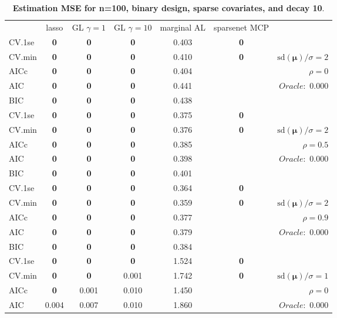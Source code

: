 \clearpage
\begin{table}\vspace{-.5cm}
\caption[l]{ { \bf Estimation MSE for n=100, binary design, 
sparse covariates, and  decay  10}.}
\vspace{-.5cm}
\footnotesize{}
\begin{center}
\begin{tabular}{l*{5}{c}|r}
& lasso & GL $\gamma=1$ & GL $\gamma=10$ & marginal AL & sparsenet MCP  & \\
 \cline{1-7}
CV.1se & {\bf 0} & {\bf 0} & {\bf 0} & 0.403 & {\bf 0} & \\
CV.min & {\bf 0} & {\bf 0} & {\bf 0} & 0.410 & {\bf 0} &  $\mathrm{sd}(\mathbf{\mu})/\sigma=2$ \\
AICc & {\bf 0} & {\bf 0} & {\bf 0} & 0.404 & & $\rho=0$ \\
AIC & {\bf 0} & {\bf 0} & {\bf 0} & 0.441 & &  \multirow{2}{*}{$Oracle: $ 0.000} \\
BIC & {\bf 0} & {\bf 0} & {\bf 0} & 0.438 & &  \\
 \hline 
CV.1se & {\bf 0} & {\bf 0} & {\bf 0} & 0.375 & {\bf 0} & \\
CV.min & {\bf 0} & {\bf 0} & {\bf 0} & 0.376 & {\bf 0} &  $\mathrm{sd}(\mathbf{\mu})/\sigma=2$ \\
AICc & {\bf 0} & {\bf 0} & {\bf 0} & 0.385 & & $\rho=0.5$ \\
AIC & {\bf 0} & {\bf 0} & {\bf 0} & 0.398 & &  \multirow{2}{*}{$Oracle: $ 0.000} \\
BIC & {\bf 0} & {\bf 0} & {\bf 0} & 0.401 & &  \\
 \hline 
CV.1se & {\bf 0} & {\bf 0} & {\bf 0} & 0.364 & {\bf 0} & \\
CV.min & {\bf 0} & {\bf 0} & {\bf 0} & 0.359 & {\bf 0} &  $\mathrm{sd}(\mathbf{\mu})/\sigma=2$ \\
AICc & {\bf 0} & {\bf 0} & {\bf 0} & 0.377 & & $\rho=0.9$ \\
AIC & {\bf 0} & {\bf 0} & {\bf 0} & 0.379 & &  \multirow{2}{*}{$Oracle: $ 0.000} \\
BIC & {\bf 0} & {\bf 0} & {\bf 0} & 0.384 & &  \\
 \hline 
CV.1se & {\bf 0} & {\bf 0} & {\bf 0} & 1.524 & {\bf 0} & \\
CV.min & {\bf 0} & {\bf 0} & 0.001 & 1.742 & {\bf 0} &  $\mathrm{sd}(\mathbf{\mu})/\sigma=1$ \\
AICc & {\bf 0} & 0.001 & 0.010 & 1.450 & & $\rho=0$ \\
AIC & 0.004 & 0.007 & 0.010 & 1.860 & &  \multirow{2}{*}{$Oracle: $ 0.000} \\

\end{tabular}
\end{center}
\end{table}
